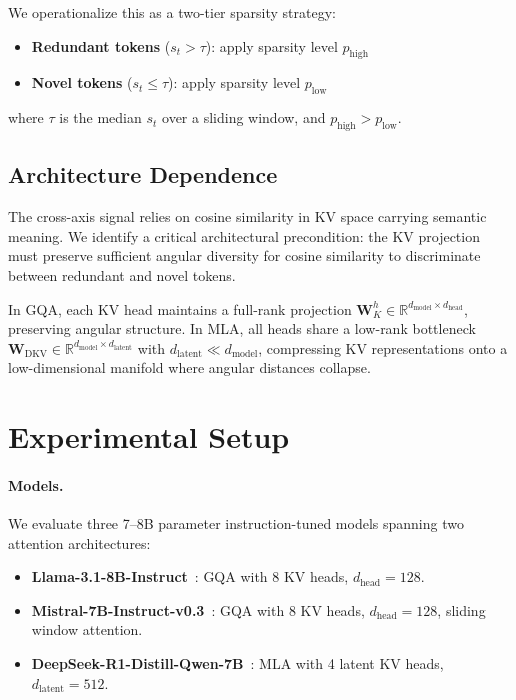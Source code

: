 \documentclass[11pt,a4paper]{article}
\begin{document}
We operationalize this as a two-tier sparsity strategy:
\begin{itemize}
    \item \textbf{Redundant tokens} ($s_t > \tau$): apply sparsity level $p_\text{high}$
    \item \textbf{Novel tokens} ($s_t \leq \tau$): apply sparsity level $p_\text{low}$
\end{itemize}
where $\tau$ is the median $s_t$ over a sliding window, and $p_\text{high} > p_\text{low}$.

\subsection{Architecture Dependence}
\label{sec:arch-dep}

The cross-axis signal relies on cosine similarity in KV space carrying semantic meaning.
We identify a critical architectural precondition: the KV projection must preserve sufficient angular diversity for cosine similarity to discriminate between redundant and novel tokens.

In GQA, each KV head maintains a full-rank projection $\mathbf{W}_K^h \in \mathbb{R}^{d_\text{model} \times d_\text{head}}$, preserving angular structure.
In MLA, all heads share a low-rank bottleneck $\mathbf{W}_\text{DKV} \in \mathbb{R}^{d_\text{model} \times d_\text{latent}}$ with $d_\text{latent} \ll d_\text{model}$, compressing KV representations onto a low-dimensional manifold where angular distances collapse.

\section{Experimental Setup}
\label{sec:setup}

\paragraph{Models.}
We evaluate three 7--8B parameter instruction-tuned models spanning two attention architectures:
\begin{itemize}
    \item \textbf{Llama-3.1-8B-Instruct}~\cite{llama3}: GQA with 8 KV heads, $d_\text{head} = 128$.
    \item \textbf{Mistral-7B-Instruct-v0.3}~\cite{jiang2023mistral}: GQA with 8 KV heads, $d_\text{head} = 128$, sliding window attention.
    \item \textbf{DeepSeek-R1-Distill-Qwen-7B}~\cite{deepseek2025r1}: MLA with 4 latent KV heads, $d_\text{latent} = 512$.
\end{itemize}
\end{document}
